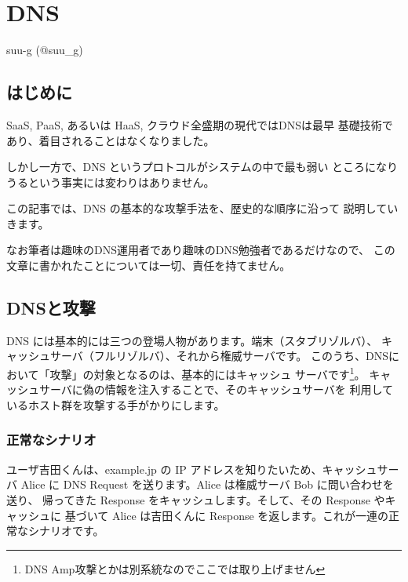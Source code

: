 
\chapter{DNS}

\begin{flushright}
 suu-g (@suu\_g)
\end{flushright}

\section{はじめに}


SaaS, PaaS, あるいは HaaS, クラウド全盛期の現代ではDNSは最早
基礎技術であり、着目されることはなくなりました。

しかし一方で、DNS というプロトコルがシステムの中で最も弱い
ところになりうるという事実には変わりはありません。

この記事では、DNS の基本的な攻撃手法を、歴史的な順序に沿って
説明していきます。

なお筆者は趣味のDNS運用者であり趣味のDNS勉強者であるだけなので、
この文章に書かれたことについては一切、責任を持てません。

\section{DNSと攻撃}

DNS には基本的には三つの登場人物があります。端末（スタブリゾルバ）、
キャッシュサーバ（フルリゾルバ）、それから権威サーバです。
このうち、DNSにおいて「攻撃」の対象となるのは、基本的にはキャッシュ
サーバです\footnote{DNS Amp攻撃とかは別系統なのでここでは取り上げません}。
キャッシュサーバに偽の情報を注入することで、そのキャッシュサーバを
利用しているホスト群を攻撃する手がかりにします。

\subsection{正常なシナリオ}
ユーザ吉田くんは、example.jp の IP アドレスを知りたいため、キャッシュサーバ
Alice に DNS Request を送ります。Alice は権威サーバ Bob に問い合わせを送り、
帰ってきた Response をキャッシュします。そして、その Response やキャッシュに
基づいて Alice は吉田くんに Response を返します。これが一連の正常なシナリオです。


